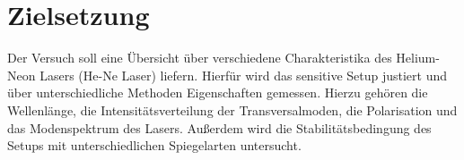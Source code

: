 \chapter{Zielsetzung}
\label{cha:zielsetzung}

Der Versuch soll eine Übersicht über verschiedene Charakteristika des Helium-Neon Lasers (He-Ne Laser) liefern.
Hierfür wird das sensitive Setup justiert und über unterschiedliche Methoden Eigenschaften gemessen. Hierzu gehören
die Wellenlänge, die Intensitätsverteilung der Transversalmoden, die Polarisation und das Modenspektrum des Lasers. Außerdem wird
die Stabilitätsbedingung des Setups mit unterschiedlichen Spiegelarten untersucht.